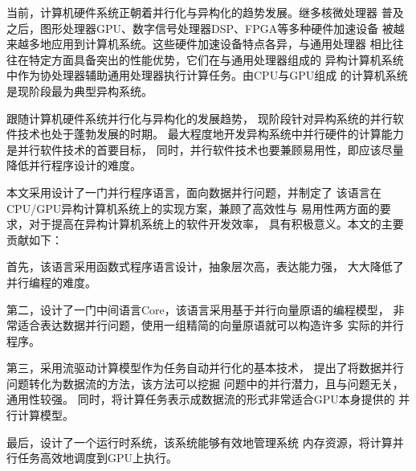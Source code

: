 \begin{cabstract}
当前，计算机硬件系统正朝着并行化与异构化的趋势发展。继多核微处理器
普及之后，图形处理器GPU、数字信号处理器DSP、FPGA等多种硬件加速设备
被越来越多地应用到计算机系统。这些硬件加速设备特点各异，与通用处理器
相比往往在特定方面具备突出的性能优势，它们在与通用处理器组成的
异构计算机系统中作为协处理器辅助通用处理器执行计算任务。由CPU与GPU组成
的计算机系统是现阶段最为典型异构系统。

跟随计算机硬件系统并行化与异构化的发展趋势，
现阶段针对异构系统的并行软件技术也处于蓬勃发展的时期。
最大程度地开发异构系统中并行硬件的计算能力是并行软件技术的首要目标，
同时，并行软件技术也要兼顾易用性，即应该尽量降低并行程序设计的难度。

本文采用设计了一门并行程序语言，面向数据并行问题，并制定了
该语言在CPU/GPU异构计算机系统上的实现方案，兼顾了高效性与
易用性两方面的要求，对于提高在异构计算机系统上的软件开发效率，
具有积极意义。本文的主要贡献如下：

首先，该语言采用函数式程序语言设计，抽象层次高，表达能力强，
大大降低了并行编程的难度。

第二，设计了一门中间语言Core，该语言采用基于并行向量原语的编程模型，
非常适合表达数据并行问题，使用一组精简的向量原语就可以构造许多
实际的并行程序。

第三，采用流驱动计算模型作为任务自动并行化的基本技术，
提出了将数据并行问题转化为数据流的方法，该方法可以挖掘
问题中的并行潜力，且与问题无关，通用性较强。
同时，将计算任务表示成数据流的形式非常适合GPU本身提供的
并行计算模型。

最后，设计了一个运行时系统，该系统能够有效地管理系统
内存资源，将计算并行任务高效地调度到GPU上执行。


\end{cabstract}

\begin{eabstract}

\end{eabstract}
\ekeywords{}

